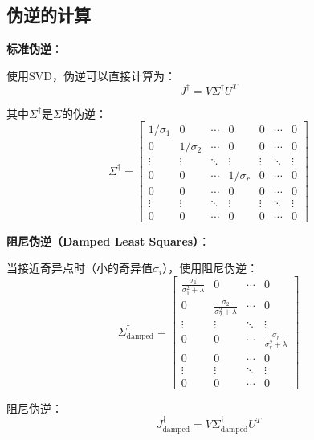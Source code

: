 \documentclass[12pt,a4paper]{article}
\begin{document}
\subsection{伪逆的计算}

\textbf{标准伪逆}：

使用SVD，伪逆可以直接计算为：
\begin{equation}
J^{\dagger} = V\Sigma^{\dagger}U^T
\end{equation}

其中$\Sigma^{\dagger}$是$\Sigma$的伪逆：
\begin{equation}
\Sigma^{\dagger} = \begin{bmatrix}
1/\sigma_1 & 0 & \cdots & 0 & 0 & \cdots & 0 \\
0 & 1/\sigma_2 & \cdots & 0 & 0 & \cdots & 0 \\
\vdots & \vdots & \ddots & \vdots & \vdots & \ddots & \vdots \\
0 & 0 & \cdots & 1/\sigma_r & 0 & \cdots & 0 \\
0 & 0 & \cdots & 0 & 0 & \cdots & 0 \\
\vdots & \vdots & \ddots & \vdots & \vdots & \ddots & \vdots \\
0 & 0 & \cdots & 0 & 0 & \cdots & 0
\end{bmatrix}
\end{equation}

\textbf{阻尼伪逆（Damped Least Squares）}：

当接近奇异点时（小的奇异值$\sigma_i$），使用阻尼伪逆：
\begin{equation}
\Sigma^{\dagger}_{\text{damped}} = \begin{bmatrix}
\frac{\sigma_1}{\sigma_1^2 + \lambda} & 0 & \cdots & 0 \\
0 & \frac{\sigma_2}{\sigma_2^2 + \lambda} & \cdots & 0 \\
\vdots & \vdots & \ddots & \vdots \\
0 & 0 & \cdots & \frac{\sigma_r}{\sigma_r^2 + \lambda} \\
0 & 0 & \cdots & 0 \\
\vdots & \vdots & \ddots & \vdots \\
0 & 0 & \cdots & 0
\end{bmatrix}
\end{equation}

阻尼伪逆：
\begin{equation}
J^{\dagger}_{\text{damped}} = V\Sigma^{\dagger}_{\text{damped}}U^T
\end{equation}
\end{document}
